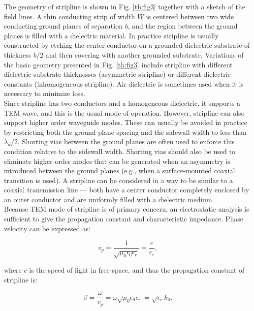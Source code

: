 \indent The geometry of stripline is shown in Fig. \ref{th:fig3} together with a sketch of the field lines.  A thin conducting strip of width $W$ is centered between two wide conducting ground planes of separation $b$, and the region between the ground planes is filled with a dielectric material. In practice stripline is usually constructed by etching the center conductor on a grounded dielectric substrate of thickness $b/2$ and then covering with another grounded substrate. Variations of the basic geometry presented in Fig. \ref{th:fig3} include stripline with different dielectric substrate thicknesses (asymmetric stripline) or different dielectric constants (inhomogeneous stripline). Air dielectric is sometimes used when it is necessary to minimize loss.
\\
\indent Since stripline has two conductors and a homogeneous dielectric, it supports a TEM wave, and this is the usual mode of operation. However, stripline can also support higher order waveguide modes. These can usually be avoided in practice by restricting both the ground plane spacing and the sidewall width to less than $\lambda _{d} /2$. Shorting vias between the ground planes are often used to enforce this condition relative to the sidewall width. Shorting vias should also be used to eliminate higher order modes that can be generated when an asymmetry is introduced between the ground planes (e.g., when a surface-mounted coaxial transition is used). A stripline can be considered in a way to be similar to a coaxial transmission line — both have a center conductor completely enclosed by an outer conductor and are uniformly filled with a dielectric medium. 
\\
\indent Because TEM mode of stripline is of primary concern, an electrostatic analysis is sufficient to give the propagation constant and characteristic impedance. Phase velocity can be expressed as:

\begin{equation}\label{th:eq26}
v_{p}=\frac{1}{\sqrt{\mu _{0}\epsilon _{0}\epsilon _{r}}}=\frac{c}{\epsilon _{r}},
\end{equation}

\noindent where $c$ is the speed of light in free-space, and thus the propagation constant of stripline is:

\begin{equation}\label{th:eq27}
\beta =\frac{\omega}{v_{p}}=\omega \sqrt{\mu _{0}\epsilon _{0}\epsilon _{r}}=\sqrt{\epsilon _{r}}k_{0}.
\end{equation}

